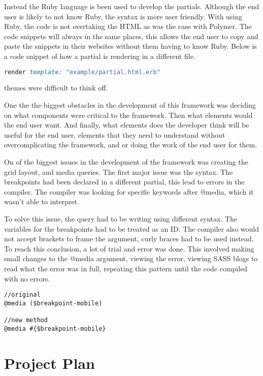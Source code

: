 Instead the Ruby language is been used to develop the partials. Although the end user is likely to not know Ruby, the syntax is more user friendly. With using Ruby, the code is not overtaking the HTML as was the case with Polymer. The code snippets will always in the same places, this allows the end user to copy and paste the snippets in their websites without them having to know Ruby. Below is a code snippet of how a partial is rendering in a different file. 

\begin{lstlisting}[language=Ruby]
render template: "example/partial.html.erb"
\end{lstlisting}


themes were difficult to think off. 

One the the biggest obstacles in the development of this framework was deciding on what components were critical to the framework. Then what elements would the end user want. And finally, what elements does the developer think will be useful for the end user, elements that they need to understand without overcomplicating the framework, and or doing the work of the end user for them.

On of the biggest issues in the development of the framework was creating the grid layout, and media queries. The first major issue was the syntax. The breakpoints had been declared in a different partial, this lead to errors in the compiler. The compiler was looking for specific keywords after @media, which it wasn't able to interpret.

To solve this issue, the query had to be writing using different syntax. The variables for the breakpoints had to be treated as an ID. The compiler also would not accept brackets to frame the argument, curly braces had to be used instead. To reach this conclusion, a lot of trial and error was done. This involved making small changes to the @media argument, viewing  the error, viewing \gls{SASS} blogs to read what the error was in full, repeating this pattern until the code compiled with no errors. 
\begin{lstlisting}[language=CSS3]
//original 
@media ($breakpoint-mobile)

//new method
@media #{$breakpoint-mobile} 
\end{lstlisting}

\newpage
\section*{Project Plan}
